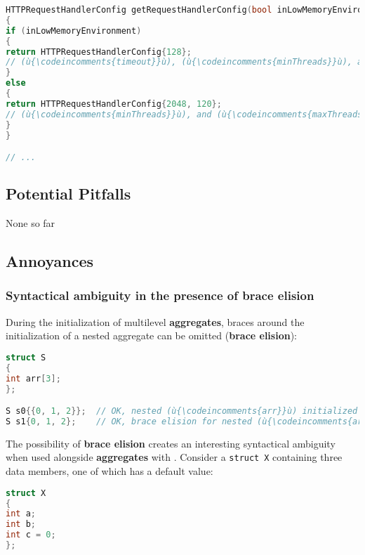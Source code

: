 \begin{lstlisting}[language=C++]
HTTPRequestHandlerConfig getRequestHandlerConfig(bool inLowMemoryEnvironment)
{
if (inLowMemoryEnvironment)
{
return HTTPRequestHandlerConfig{128};
// (ù{\codeincomments{timeout}}ù), (ù{\codeincomments{minThreads}}ù), and (ù{\codeincomments{maxThreads}}ù) have their default value.
}
else
{
return HTTPRequestHandlerConfig{2048, 120};
// (ù{\codeincomments{minThreads}}ù), and (ù{\codeincomments{maxThreads}}ù) have their default value.
}
}

// ...
\end{lstlisting}


\subsection[Potential Pitfalls]{Potential Pitfalls}\label{potential-pitfalls}

None so far

\subsection[Annoyances]{Annoyances}\label{annoyances}

\subsubsection[Syntactical ambiguity in the presence of \textbf{brace elision}]{Syntactical ambiguity in the presence of \textbf{brace elision}}\label{syntactical-ambiguity-in-the-presence-of-brace-elision}

During the initialization of multilevel \textbf{aggregates}, braces
around the initialization of a nested aggregate can be omitted
(\textbf{brace elision}):

\begin{lstlisting}[language=C++]
struct S
{
int arr[3];
};

S s0{{0, 1, 2}};  // OK, nested (ù{\codeincomments{arr}}ù) initialized explicitly
S s1{0, 1, 2};    // OK, brace elision for nested (ù{\codeincomments{arr}}ù)
\end{lstlisting}

\noindent The possibility of \textbf{brace elision} creates an interesting
syntactical ambiguity when used alongside \textbf{aggregates} with
. Consider a
\texttt{struct}~\texttt{X} containing three data members, one of which
has a default value:

\begin{lstlisting}[language=C++]
struct X
{
int a;
int b;
int c = 0;
};
\end{lstlisting}


